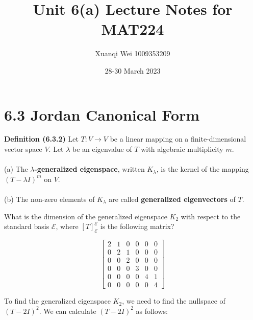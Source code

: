\documentclass[fontsize=12pt]{scrartcl}
\title{Unit 6(a) Lecture Notes for MAT224}
\author{Xuanqi Wei 1009353209}
\date{28-30 March 2023}
\begin{document}
\maketitle

\newpage

\section{6.3 Jordan Canonical Form}

\bigskip

\noindent
\textbf{Definition (6.3.2)} Let $T: V \to V$ be a linear mapping on a finite-dimensional vector space $V$. Let $\lambda$ be an eigenvalue of $T$ with algebraic multiplicity $m$.\\
\\
(a) The \textbf{$\lambda$-generalized eigenspace}, written $K_{\lambda}$, is the kernel of the mapping $(T - \lambda I)^m$ on $V$.\\
\\
(b) The non-zero elements of $K_{\lambda}$ are called \textbf{generalized eigenvectors} of $T$.\\
\bigskip

\hline
\bigskip

\noindent
What is the dimension of the generalized eigenspace $K_2$ with respect to the standard basis $\mathcal{E}$, where $[T]_{\mathcal{E}}^{\mathcal{E}}$ is the following matrix?

$$\begin{bmatrix} 2 & 1 & 0 & 0 & 0 & 0 \\
0 & 2 & 1 & 0 & 0 & 0 \\
0 & 0 & 2 & 0 & 0 & 0 \\
0 & 0 & 0 & 3 & 0 & 0 \\
0 & 0 & 0 & 0 & 4 & 1 \\
0 & 0 & 0 & 0 & 0 & 4 \end{bmatrix} $$

To find the generalized eigenspace $K_2$, we need to find the nullspace of $(T - 2I)^2$. We can calculate $(T - 2I)^2$ as follows:
\end{document}

